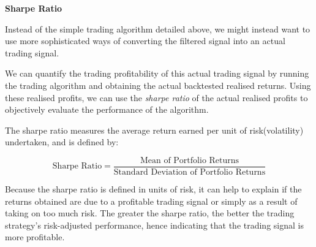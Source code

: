 \documentclass[../main.tex]{subfiles}
\begin{document}
\textbf{Sharpe Ratio}

Instead of the simple trading algorithm detailed above, we might instead want to use more sophisticated ways of  converting the filtered signal into an actual trading signal. 

We can quantify the trading profitability of this actual trading signal by running the trading algorithm and obtaining the actual backtested realised returns. Using these realised profits, we can use the \textit{sharpe ratio} of the actual realised profits to objectively evaluate the performance of the algorithm. 

The sharpe ratio measures the average return earned per unit of risk(volatility) undertaken, and is defined by: 

\begin{equation}
	\text{Sharpe Ratio} = \frac{\text{Mean of Portfolio Returns}}{\text{Standard Deviation of Portfolio Returns}}
\end{equation}

Because the sharpe ratio is defined in units of risk, it can help to explain if the returns obtained are due to a profitable trading signal or simply as a result of taking on too much risk. The greater the sharpe ratio, the better the trading strategy's risk-adjusted performance, hence indicating that the trading signal is more profitable. 
	
\end{document}
